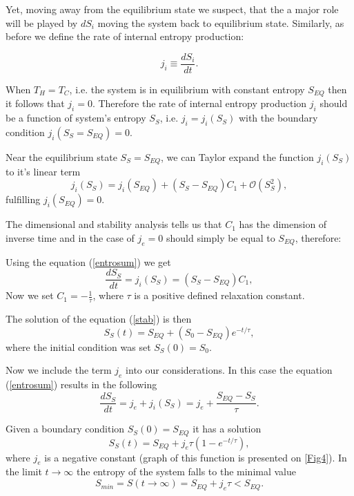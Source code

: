\documentclass[a4paper,12pt,nofootinbib]{article}
\begin{document}
Yet, moving away from the equilibrium state we suspect, that the a major role will be played by $dS_i$ moving the system back to equilibrium state. Similarly, as before we define the rate of internal entropy production:

\begin{equation}
j_i \equiv \frac{dS_i}{dt}.   
\end{equation} 

When $T_H=T_C$, i.e. the system is in equilibrium with constant entropy $S_{EQ}$ then it follows that $j_i=0$.
Therefore the rate of internal entropy production $j_i$ should be a function  of system's entropy $S_S$, i.e. $j_i = j_i(S_S)$ with the boundary condition $j_i(S_S=S_{EQ})=0$. 

Near the equilibrium state $S_S=S_{EQ}$, we can Taylor expand the function $j_i(S_S)$ to it's linear term
\begin{equation}
j_i(S_S)=j_i\left(S_{EQ}\right)+\left(S_S-S_{EQ}\right)C_1+\mathcal{O}\left(S_S^2\right),
\end{equation} 
fulfilling $j_i\left(S_{EQ}\right)=0$. 

The dimensional and stability analysis tells us that $C_1$ has the dimension of inverse time and in the case of 
$j_e=0$ should simply be equal to $S_{EQ}$, therefore:

Using the equation (\ref{entrosum}) we get
\begin{equation}
\frac{dS_S}{dt}=j_i\left(S_S\right)=\left(S_S-S_{EQ}\right)C_1, 
\label{stab}
\end{equation} 
Now we set $C_1 = -\frac{1}{\tau}$, where $\tau$ is a positive defined relaxation constant.

The solution of the equation (\ref{stab}) is then
\begin{equation}
S_S(t) =S_{EQ}+(S_0-S_{EQ})e^{-t/\tau}, 
\end{equation}
where the initial condition was set $S_S(0)=S_0$.


Now we include the term $j_e$ into our considerations.
In this case the equation (\ref{entrosum}) results in the following 
\begin{equation}
\frac{dS_S}{dt}=j_e + j_i\left(S_S\right)=j_e +\frac{S_{EQ}-S_S}{\tau}.
\label{dSSdt}
\end{equation} 

 
Given a boundary condition $S_S(0) =S_{EQ}$ it has a solution
\begin{equation}
S_S(t)=S_{EQ}+j_e\tau \left(1-e^{-t/\tau }\right),
\end{equation} 
where $j_e$ is a negative constant (graph of this function is presented on \ref{Fig4}). 
In the limit $t\rightarrow \infty$ the entropy of the system falls to the minimal value
\begin{equation}
S_{min}=S(t\rightarrow \infty) =S_{EQ}+j_e \tau < S_{EQ}.
\end{equation}
\end{document}
